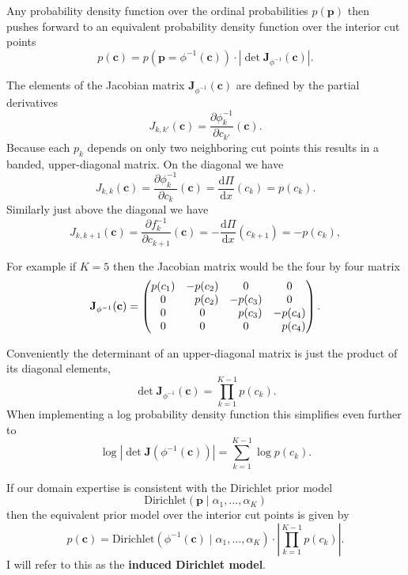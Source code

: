 \documentclass[
  letterpaper,
  DIV=11,
  numbers=noendperiod]{scrartcl}
\begin{document}
Any probability density function over the ordinal probabilities
\(p(\mathbf{p})\) then pushes forward to an equivalent probability
density function over the interior cut points \[
p( \mathbf{c} )
=
p \left( \mathbf{p} = \phi^{-1}(\mathbf{c}) \right)
\cdot \left| \det \mathbf{J}_{\phi^{-1}} (\mathbf{c}) \right|.
\]

The elements of the Jacobian matrix
\(\mathbf{J}_{\phi^{-1}}(\mathbf{c})\) are defined by the partial
derivatives \[
J_{k,k'} (\mathbf{c})
=
\frac{ \partial \phi^{-1}_{k} }{ \partial c_{k'} } (\mathbf{c}).
\] Because each \(p_{k}\) depends on only two neighboring cut points
this results in a banded, upper-diagonal matrix. On the diagonal we have
\[
J_{k,k} (\mathbf{c})
=
\frac{ \partial \phi^{-1}_{k} }{ \partial c_{k} } (\mathbf{c})
=
\frac{ \mathrm{d} \Pi }{ \mathrm{d} x }(c_{k})
=
p(c_{k}).
\] Similarly just above the diagonal we have \[
J_{k,k + 1} (\mathbf{c} )
=
\frac{ \partial f^{-1}_{k} }{ \partial c_{k + 1} } (\mathbf{c})
=
-\frac{ \mathrm{d} \Pi }{ \mathrm{d} x }(c_{k + 1})
=
-p(c_{k}),
\]

For example if \(K = 5\) then the Jacobian matrix would be the four by
four matrix \[
\mathbf{J}_{\phi^{-1}} ( \mathbf{c} )
=
\begin{pmatrix}
 p(c_{1}) &
-p(c_{2}) &
        0 &
        0 \\
        0 &
\hphantom{-} p(c_{2}) &
-p(c_{3}) &
        0 \\
        0 &
        0 &
\hphantom{-} p(c_{3}) &
-p(c_{4}) \\
        0 &
        0 &
        0 &
\hphantom{-} p(c_{4})
\end{pmatrix}.
\]

Conveniently the determinant of an upper-diagonal matrix is just the
product of its diagonal elements, \[
\det \mathbf{J}_{\phi^{-1}} ( \mathbf{c} )
=
\prod_{k = 1}^{K - 1} p(c_{k}).
\] When implementing a log probability density function this simplifies
even further to \[
\log | \det \mathbf{J} \left( \phi^{-1}(\mathbf{c}) \right) |
=
\sum_{k = 1}^{K - 1}
\log p(c_{k}).
\]

If our domain expertise is consistent with the Dirichlet prior model \[
\text{Dirichlet} \left( \mathbf{p} \mid
                        \alpha_{1}, \ldots, \alpha_{K} \right)
\] then the equivalent prior model over the interior cut points is given
by \[
p( \mathbf{c} )
=
\text{Dirichlet} \left( \phi^{-1}(\mathbf{c}) \mid
                  \alpha_{1}, \ldots, \alpha_{K} \right)
\cdot \left| \prod_{k = 1}^{K - 1} p(c_{k}) \right|.
\] I will refer to this as the \textbf{induced Dirichlet model}.
\end{document}

